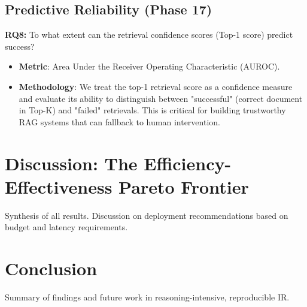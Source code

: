 \documentclass[sigconf]{acmart}
\begin{document}
\subsection{Predictive Reliability (Phase 17)}
\textbf{RQ8:} To what extent can the retrieval confidence scores (Top-1 score) predict success?
\begin{itemize}
    \item \textbf{Metric}: Area Under the Receiver Operating Characteristic (AUROC).
    \item \textbf{Methodology}: We treat the top-1 retrieval score as a confidence measure and evaluate its ability to distinguish between "successful" (correct document in Top-K) and "failed" retrievals. This is critical for building trustworthy RAG systems that can fallback to human intervention.
\end{itemize}

\section{Discussion: The Efficiency-Effectiveness Pareto Frontier}
Synthesis of all results. Discussion on deployment recommendations based on budget and latency requirements.

\section{Conclusion}
Summary of findings and future work in reasoning-intensive, reproducible IR.



\end{document}
